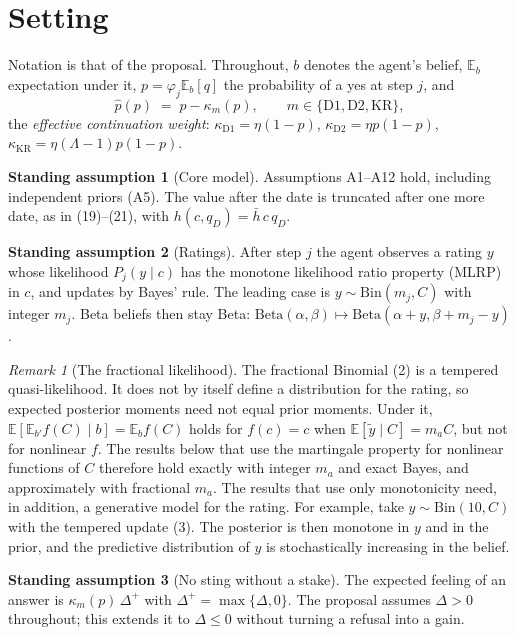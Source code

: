 \documentclass[11pt,a4paper]{article}
\theoremstyle{definition}
\newtheorem{assumption}{Standing assumption}
\theoremstyle{remark}
\newtheorem{remark}[theorem]{Remark}
\newcommand{\E}{\mathbb{E}}
\newcommand{\pp}{\hat p}
\begin{document}
\section{Setting}\label{sec:setting}

Notation is that of the proposal. Throughout, $b$ denotes the agent's belief, $\E_b$ expectation under it, $p=\varphi_j\E_b[q]$ the probability of a yes at step $j$, and
\[
\pp(p)\;=\;p-\kappa_m(p),\qquad m\in\{\mathrm{D1},\mathrm{D2},\mathrm{KR}\},
\]
the \emph{effective continuation weight}: $\kappa_{\mathrm{D1}}=\eta(1-p)$, $\kappa_{\mathrm{D2}}=\eta p(1-p)$, $\kappa_{\mathrm{KR}}=\eta(\Lambda-1)p(1-p)$.

\begin{assumption}[Core model]\label{S:core}
Assumptions A1--A12 hold, including independent priors (A5). The value after the date is truncated after one more date, as in (19)--(21), with $h(c,q_D)=\bar h\,c\,q_D$.
\end{assumption}

\begin{assumption}[Ratings]\label{S:ratings}
After step $j$ the agent observes a rating $y$ whose likelihood $P_j(y\mid c)$ has the monotone likelihood ratio property (MLRP) in $c$, and updates by Bayes' rule. The leading case is $y\sim\mathrm{Bin}(m_j,C)$ with integer $m_j$. Beta beliefs then stay Beta: $\mathrm{Beta}(\alpha,\beta)\mapsto\mathrm{Beta}(\alpha+y,\beta+m_j-y)$.
\end{assumption}

\begin{remark}[The fractional likelihood]
The fractional Binomial (2) is a tempered quasi-likelihood. It does not by itself define a distribution for the rating, so expected posterior moments need not equal prior moments. Under it, $\E[\E_{b'}f(C)\mid b]=\E_bf(C)$ holds for $f(c)=c$ when $\E[\tilde y\mid C]=m_aC$, but not for nonlinear $f$. The results below that use the martingale property for nonlinear functions of $C$ therefore hold exactly with integer $m_a$ and exact Bayes, and approximately with fractional $m_a$. The results that use only monotonicity need, in addition, a generative model for the rating. For example, take $y\sim\mathrm{Bin}(10,C)$ with the tempered update (3). The posterior is then monotone in $y$ and in the prior, and the predictive distribution of $y$ is stochastically increasing in the belief.
\end{remark}

\begin{assumption}[No sting without a stake]\label{S:plus}
The expected feeling of an answer is $\kappa_m(p)\,\Delta^{+}$ with $\Delta^{+}=\max\{\Delta,0\}$. The proposal assumes $\Delta>0$ throughout; this extends it to $\Delta\le0$ without turning a refusal into a gain.
\end{assumption}
\end{document}
